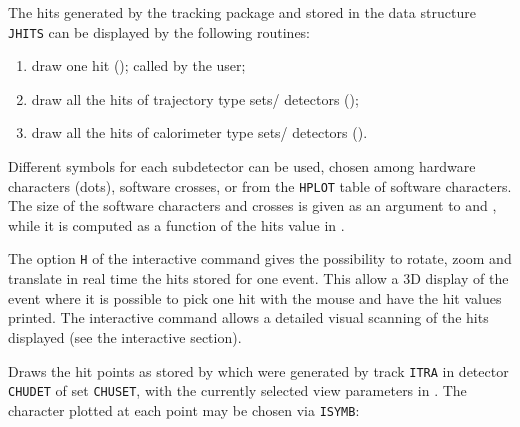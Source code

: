     
The hits generated by the tracking package and stored in the
data structure {\tt JHITS} can be displayed by the following routines:
\begin{enumerate}
\item draw one hit (); called by the user;
\item draw all the hits of trajectory type sets/ detectors ();
\item draw all the hits of calorimeter type sets/ detectors ().
\end{enumerate}

Different symbols for each subdetector can be used, chosen among
hardware characters (dots), software crosses, or from the {\tt HPLOT} table
of software characters.
The size of the software characters and crosses is given as an argument
to  and , while it is computed as a function of 
the hits value in .

The option {\tt H} of the interactive  command gives the 
possibility
to rotate, zoom and translate in real time the hits stored for one event.
This allow a 3D display of the event where it is possible to pick one hit 
with the mouse and have the hit values printed.  The interactive 
command  allows a detailed visual scanning of the 
hits displayed (see the interactive section).   

Draws the hit points as stored by  which were
generated by track {\tt ITRA} in detector {\tt CHUDET} of set {\tt CHUSET},
with the currently selected view parameters in .
The character plotted at each point may be chosen via {\tt ISYMB}:
 
